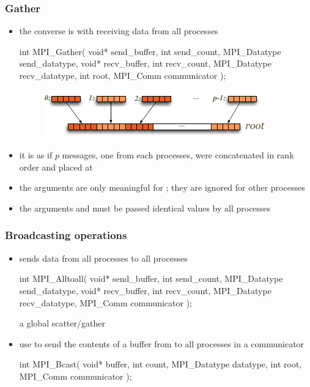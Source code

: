 \begin{frame}[fragile]
%
  \frametitle{Gather}
%
  \begin{itemize}
%
  \item the converse is  with  receiving data from all
    processes
    \begin{C}
int MPI_Gather(
        void* send_buffer, int send_count, MPI_Datatype send_datatype,
        void* recv_buffer, int recv_count, MPI_Datatype recv_datatype,
        int root, MPI_Comm communicator
        );
   \end{C}
   \begin{figure}
     \centering
     \includegraphics[scale=1.0]{figures/mpi-gather.pdf}
   \end{figure}
%
  \item it is as if $p$ messages, one from each processes, were concatenated in rank order and
    placed at 
%
  \item the  arguments are only meaningful for ; they
    are ignored for other processes
%
  \item the arguments  and  must be passed identical
    values by all processes
%
  \end{itemize}
%
\end{frame}

\begin{frame}[fragile]
%
  \frametitle{Broadcasting operations}
%
  \begin{itemize}
%
  \item {} sends data from all processes to all processes
    \begin{C}
int MPI_Alltoall(
        void* send_buffer, int send_count, MPI_Datatype send_datatype,
        void* recv_buffer, int recv_count, MPI_Datatype recv_datatype,
        MPI_Comm communicator
        );
   \end{C}
%
   a global scatter/gather
%
 \item use  to send the contents of a buffer from  to all
   processes in a communicator
   \begin{C}
int MPI_Bcast(
        void* buffer, int count, MPI_Datatype datatype,
        int root, MPI_Comm communicator
        );
   \end{C}
%
  \end{itemize}
%
\end{frame}


